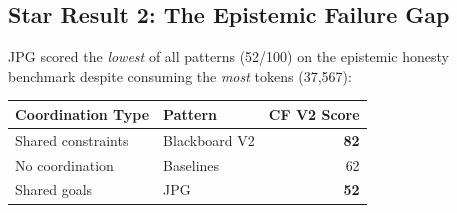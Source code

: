 \documentclass{article}
\begin{document}
\subsection{Star Result 2: The Epistemic Failure Gap}
\label{sec:exp-jpg}

%
%
%
%
%
%

JPG scored the \emph{lowest} of all patterns (52/100) on the epistemic honesty
benchmark despite consuming the \emph{most} tokens (37,567):

\begin{center}
\begin{tabular}{@{} l l r @{}}
\toprule
\textbf{Coordination Type} & \textbf{Pattern} & \textbf{CF V2 Score} \\
\midrule
Shared constraints & Blackboard V2 & \textbf{82} \\
No coordination & Baselines & 62 \\
Shared goals & JPG & \textbf{52} \\
\bottomrule
\end{tabular}
\end{center}
\end{document}
